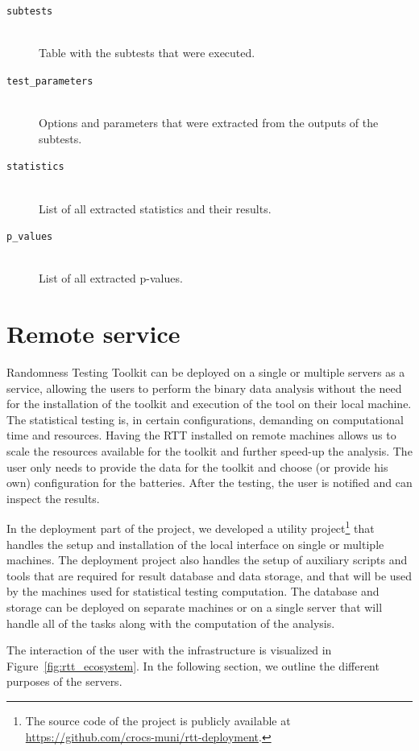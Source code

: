 \documentclass[
	digital,    %
	oneside,
	color,
	11pt,
	nocover,
	notable,
	nolof,
	nolot,
]{fithesis3}
\theoremstyle{definition}
\theoremstyle{remark}
\begin{document}
\begin{description}
\item[\texttt{subtests}] \hfill \\
Table with the subtests that were executed.

\item[\texttt{test\_parameters}] \hfill \\
Options and parameters that were extracted from the outputs of the subtests.

\item[\texttt{statistics}] \hfill \\
List of all extracted statistics and their results.

\item[\texttt{p\_values}] \hfill \\
List of all extracted p-values.
\end{description}

\section{Remote service}
Randomness Testing Toolkit can be deployed on a single or multiple servers as a service, allowing the users to perform the binary data analysis without the need for the installation of the toolkit and execution of the tool on their local machine. The statistical testing is, in certain configurations, demanding on computational time and resources. Having the RTT installed on remote machines allows us to scale the resources available for the toolkit and further speed-up the analysis. The user only needs to provide the data for the toolkit and choose (or provide his own) configuration for the batteries. After the testing, the user is notified and can inspect the results.

In the deployment part of the project, we developed a utility project\footnote{The source code of the project is publicly available at \url{https://github.com/crocs-muni/rtt-deployment}.} that handles the setup and installation of the local interface on single or multiple machines. The deployment project also handles the setup of auxiliary scripts and tools that are required for result database and data storage, and that will be used by the machines used for statistical testing computation. The database and storage can be deployed on separate machines or on a single server that will handle all of the tasks along with the computation of the analysis. 

The interaction of the user with the infrastructure is visualized in Figure~\ref{fig:rtt_ecosystem}. In the following section, we outline the different purposes of the servers.
\end{document}
